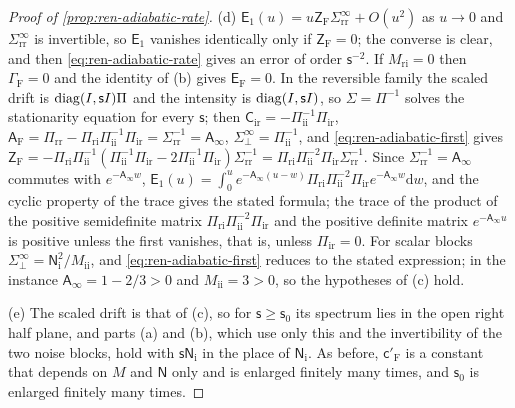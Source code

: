 \begin{proof}[Proof of \cref{prop:ren-adiabatic-rate}]
(d) $\mathsf E_1(u)=u\mathsf Z_{\mathrm F}\Sigma^\infty_{\mathrm{rr}}+O(u^2)$ as $u\to0$ and $\Sigma^\infty_{\mathrm{rr}}$ is invertible, so $\mathsf E_1$ vanishes identically only if $\mathsf Z_{\mathrm F}=0$; the converse is clear, and then \eqref{eq:ren-adiabatic-rate} gives an error of order $\mathsf s^{-2}$. If $M_{\mathrm{ri}}=0$ then $\Gamma_{\mathrm F}=0$ and the identity of (b) gives $\mathsf E_{\mathrm F}=0$. In the reversible family the scaled drift is $\operatorname{diag}(I,\mathsf sI)\Pi$ and the intensity is $\operatorname{diag}(I,\mathsf sI)$, so $\Sigma=\Pi^{-1}$ solves the stationarity equation for every $\mathsf s$; then $\mathsf C_{\mathrm{ir}}=-\Pi_{\mathrm{ii}}^{-1}\Pi_{\mathrm{ir}}$, $\mathsf A_{\mathrm F}=\Pi_{\mathrm{rr}}-\Pi_{\mathrm{ri}}\Pi_{\mathrm{ii}}^{-1}\Pi_{\mathrm{ir}}=\Sigma_{\mathrm{rr}}^{-1}=\mathsf A_\infty$, $\Sigma^\infty_\perp=\Pi_{\mathrm{ii}}^{-1}$, and \eqref{eq:ren-adiabatic-first} gives $\mathsf Z_{\mathrm F}=-\Pi_{\mathrm{ri}}\Pi_{\mathrm{ii}}^{-1}(\Pi_{\mathrm{ii}}^{-1}\Pi_{\mathrm{ir}}-2\Pi_{\mathrm{ii}}^{-1}\Pi_{\mathrm{ir}})\Sigma_{\mathrm{rr}}^{-1}=\Pi_{\mathrm{ri}}\Pi_{\mathrm{ii}}^{-2}\Pi_{\mathrm{ir}}\Sigma_{\mathrm{rr}}^{-1}$. Since $\Sigma_{\mathrm{rr}}^{-1}=\mathsf A_\infty$ commutes with $e^{-\mathsf A_\infty w}$, $\mathsf E_1(u)=\int_0^ue^{-\mathsf A_\infty(u-w)}\Pi_{\mathrm{ri}}\Pi_{\mathrm{ii}}^{-2}\Pi_{\mathrm{ir}}e^{-\mathsf A_\infty w}\mathrm dw$, and the cyclic property of the trace gives the stated formula; the trace of the product of the positive semidefinite matrix $\Pi_{\mathrm{ri}}\Pi_{\mathrm{ii}}^{-2}\Pi_{\mathrm{ir}}$ and the positive definite matrix $e^{-\mathsf A_\infty u}$ is positive unless the first vanishes, that is, unless $\Pi_{\mathrm{ir}}=0$. For scalar blocks $\Sigma^\infty_\perp=\mathsf N_{\mathrm i}^2/M_{\mathrm{ii}}$, and \eqref{eq:ren-adiabatic-first} reduces to the stated expression; in the instance $\mathsf A_\infty=1-2/3>0$ and $M_{\mathrm{ii}}=3>0$, so the hypotheses of (c) hold.

(e) The scaled drift is that of (c), so for $\mathsf s\ge\mathsf s_0$ its spectrum lies in the open right half plane, and parts (a) and (b), which use only this and the invertibility of the two noise blocks, hold with $\mathsf s\mathsf N_{\mathrm i}$ in the place of $\mathsf N_{\mathrm i}$. As before, $\mathsf c'_{\mathrm F}$ is a constant that depends on $M$ and $\mathsf N$ only and is enlarged finitely many times, and $\mathsf s_0$ is enlarged finitely many times.


\end{proof}
